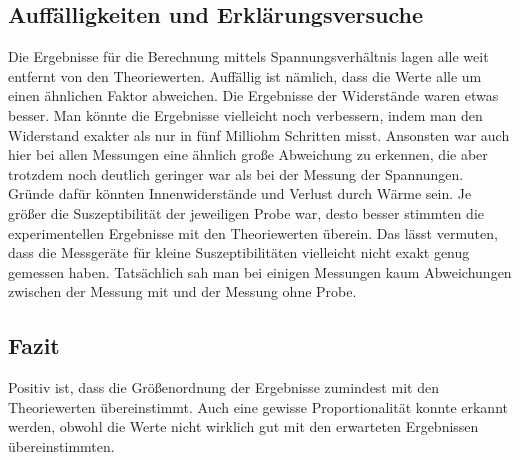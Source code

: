 


\subsection{Auffälligkeiten und Erklärungsversuche}
Die Ergebnisse für die Berechnung mittels Spannungsverhältnis lagen alle weit entfernt von den Theoriewerten.  
Auffällig ist nämlich, dass die Werte alle um einen ähnlichen Faktor abweichen. 
\newline
Die Ergebnisse der Widerstände waren etwas besser. Man könnte die Ergebnisse vielleicht noch verbessern, indem man den Widerstand exakter als 
nur in fünf Milliohm Schritten misst. Ansonsten war auch hier bei allen Messungen eine ähnlich große Abweichung zu erkennen, die aber 
trotzdem noch deutlich geringer war als bei der Messung der Spannungen. Gründe dafür könnten Innenwiderstände und Verlust durch Wärme sein. 
\newline
Je größer die Suszeptibilität der jeweiligen Probe war, desto besser stimmten die experimentellen Ergebnisse mit den Theoriewerten überein. 
Das lässt vermuten, dass die Messgeräte für kleine Suszeptibilitäten vielleicht nicht exakt genug gemessen haben. Tatsächlich sah man bei 
einigen Messungen kaum Abweichungen zwischen der Messung mit und der Messung ohne Probe. 

\subsection{Fazit}
Positiv ist, dass die Größenordnung der Ergebnisse zumindest mit den Theoriewerten übereinstimmt. Auch eine gewisse  Proportionalität konnte 
erkannt werden, obwohl die Werte nicht wirklich gut mit den erwarteten Ergebnissen übereinstimmten.
